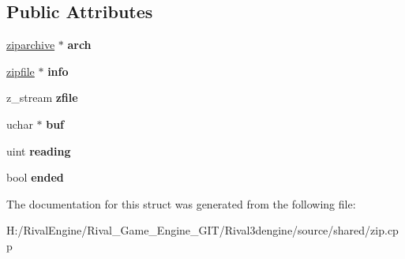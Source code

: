 \subsection*{Public Attributes}
\begin{DoxyCompactItemize}
\item 
\mbox{\label{structzipstream_af955c5fb2e417043181c31c8b6b369a6}} 
\hyperlink{structziparchive}{ziparchive} $\ast$ {\bfseries arch}
\item 
\mbox{\label{structzipstream_a6f4535a7a7ead6205656d25129abcdbb}} 
\hyperlink{structzipfile}{zipfile} $\ast$ {\bfseries info}
\item 
\mbox{\label{structzipstream_a3883353e36ce50d96b73eae81f99b98b}} 
z\+\_\+stream {\bfseries zfile}
\item 
\mbox{\label{structzipstream_ad025d073530e2b649aac6c6691158c64}} 
uchar $\ast$ {\bfseries buf}
\item 
\mbox{\label{structzipstream_a9afb91a7e9cc20777caa71d7a643b041}} 
uint {\bfseries reading}
\item 
\mbox{\label{structzipstream_ac586de5ad8394e7074b4d649b6205043}} 
bool {\bfseries ended}
\end{DoxyCompactItemize}


The documentation for this struct was generated from the following file\+:\begin{DoxyCompactItemize}
\item 
H\+:/\+Rival\+Engine/\+Rival\+\_\+\+Game\+\_\+\+Engine\+\_\+\+G\+I\+T/\+Rival3dengine/source/shared/zip.\+cpp\end{DoxyCompactItemize}
